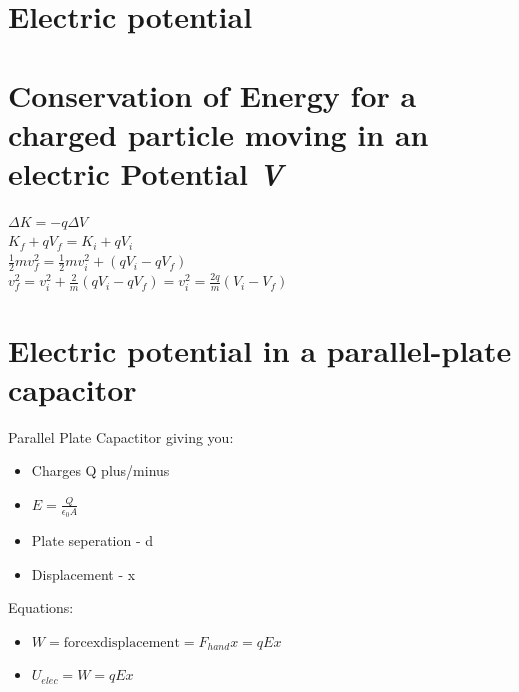 \documentclass{report}   
\begin{document}


\section{Electric potential}



\section{Conservation of Energy for a charged particle moving in an electric Potential \textit{V}}
\begin{center}
$ \Delta K = -q \Delta \textit{V} $
\\
$ K_f + q\textit{V}_f = K_i + q\textit{V}_i $
\\
$ \frac{1}{2} mv_f^2 = \frac{1}{2}mv_i^2 + (q\textit{V}_i - q\textit{V}_f) $
\\
$ v_f^2 = v_i^2 + \frac{2}{m}(q\textit{V}_i - q\textit{V}_f) = v_i^2 = \frac{2q}{m} (\textit{V}_i - \textit{V}_f) $
\end{center}

\section{Electric potential in a parallel-plate capacitor}
Parallel Plate Capactitor giving you:

\begin{itemize}
  \item Charges Q plus/minus
  \item $ E = \frac{Q}{\epsilon_0 A} $
  \item Plate seperation - d 
  \item Displacement - x 
\end{itemize}


Equations:
\begin{itemize}
\item $ W = \mathrm{force} \mathrm{x} \mathrm{displacement} = F_{hand}x = qEx $
  \item $ U_{elec} = W = qEx $
\end{itemize}
\end{document}
